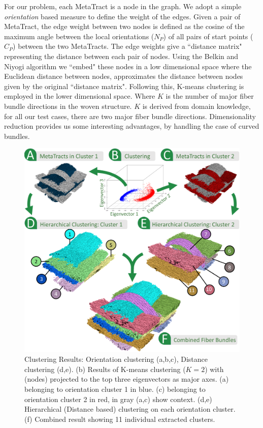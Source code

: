 For our problem, each MetaTract is a node in the graph. We adopt a simple \textit{orientation} based measure to define the weight of the edges. Given a pair of MetaTract, the edge weight between two nodes is defined as the cosine of the maximum angle between the local orientations ($N_P$) of all pairs of start points ($C_P$) between the two MetaTracts. The edge weights give a ``distance matrix" representing the distance between each pair of nodes. Using the Belkin and Niyogi algorithm we ``embed" these nodes in a low dimensional space where the Euclidean distance between nodes, approximates the distance between nodes given by the original ``distance matrix". 
Following this, K-means clustering is employed in the lower dimensional space. Where $K$ is the number of major fiber bundle directions in the woven structure. $K$ is derived from domain knowledge,
for all our test cases, there are two major fiber bundle directions. 
Dimensionality reduction provides us some interesting advantages, by handling the case of curved bundles.
\begin{figure}[htb] 
	\centering  	
	\includegraphics[width=\linewidth]{images/clustering.eps}
	\caption{Clustering Results: Orientation clustering (a,b,c), Distance clustering (d,e).
		 (b) Results of K-means clustering ($K=2$) with \mt (nodes) projected to the top three eigenvectors as major axes. (a) \mt belonging to orientation cluster 1 in blue. (c) \mt belonging to orientation cluster 2 in red, \mt in gray (a,c) show context.
		(d,e) Hierarchical (Distance based) clustering on each orientation cluster. (f) Combined result showing 11 individual extracted clusters. }
	\label{fig:orientation_clustering}
	\vskip-0.2cm
\end{figure} 
